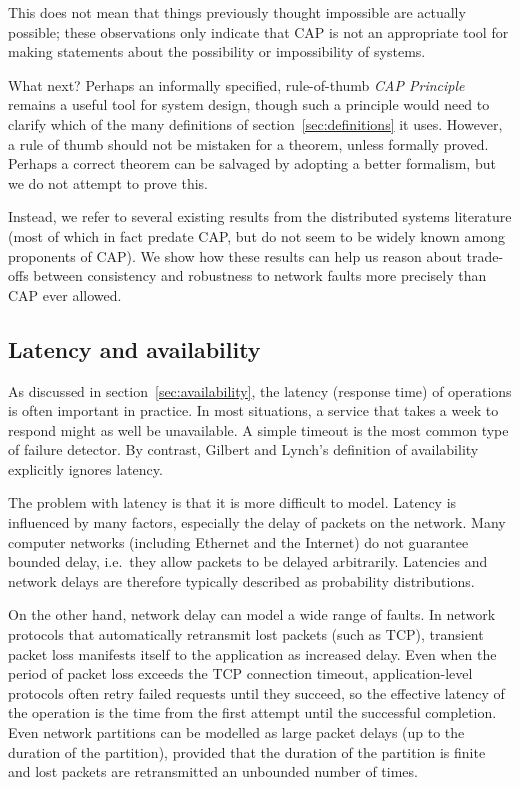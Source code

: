 \documentclass[a4paper,twocolumn,10pt]{article}
\begin{document}
This does not mean that things previously thought impossible are actually possible; these
observations only indicate that CAP is not an appropriate tool for making statements about the
possibility or impossibility of systems.

What next? Perhaps an informally specified, rule-of-thumb \emph{CAP Principle} remains a useful tool
for system design, though such a principle would need to clarify which of the many definitions of
section~\ref{sec:definitions} it uses. However, a rule of thumb should not be mistaken for a
theorem, unless formally proved. Perhaps a correct theorem can be salvaged by adopting a better
formalism, but we do not attempt to prove this.

Instead, we refer to several existing results from the distributed systems literature (most of which
in fact predate CAP, but do not seem to be widely known among proponents of CAP). We show how these
results can help us reason about trade-offs between consistency and robustness to network faults
more precisely than CAP ever allowed.

\subsection{Latency and availability}\label{sec:latency-availability}

As discussed in section~\ref{sec:availability}, the latency (response time) of operations is often
important in practice. In most situations, a service that takes a week to respond might as well be
unavailable. A simple timeout is the most common type of failure detector. By contrast, Gilbert and
Lynch's definition of availability explicitly ignores latency.

The problem with latency is that it is more difficult to model. Latency is influenced by many
factors, especially the delay of packets on the network. Many computer networks (including Ethernet
and the Internet) do not guarantee bounded delay, i.e.\ they allow packets to be delayed
arbitrarily. Latencies and network delays are therefore typically described as probability
distributions.

On the other hand, network delay can model a wide range of faults. In network protocols that
automatically retransmit lost packets (such as TCP), transient packet loss manifests itself to the
application as increased delay. Even when the period of packet loss exceeds the TCP connection
timeout, application-level protocols often retry failed requests until they succeed, so the
effective latency of the operation is the time from the first attempt until the successful
completion. Even network partitions can be modelled as large packet delays (up to the duration of
the partition), provided that the duration of the partition is finite and lost packets are
retransmitted an unbounded number of times.
\end{document}

